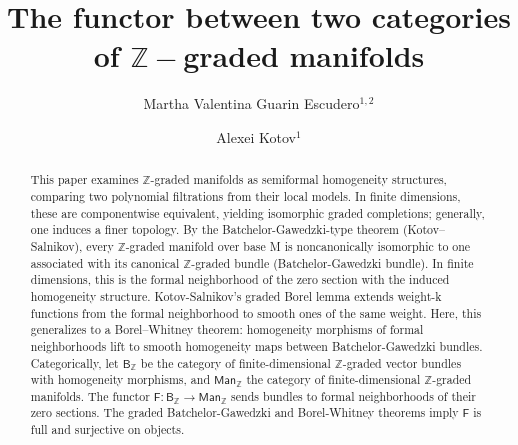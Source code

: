 \documentclass[a4paper,12pt]{amsart}
\newcommand{\Z}{{\mathbb Z}}
\begin{document}
    



\title{The functor between two categories of $\Z-$graded manifolds}


\author{Martha Valentina Guarin Escudero$^{1,2}$}


\author{Alexei Kotov$^1$}
\address{1. Faculty of Science, University of Hradec Kralove, Rokitanskeho 62, Hradec Kralove
50003, Czech Republic}

\address{2. Mathematical Institute of Charles University,
Sokolovská 49/83, Prague-8 186 75, Czech Republic }



\begin{abstract} 
This paper examines \(\mathbb{Z}\)-graded manifolds as semiformal homogeneity structures, comparing two polynomial filtrations from their local models. In finite dimensions, these are componentwise equivalent, yielding isomorphic graded completions; generally, one induces a finer topology. By the Batchelor-Gawedzki-type theorem (Kotov--Salnikov), every \(\mathbb{Z}\)-graded manifold over base M is noncanonically isomorphic to one associated with its canonical \(\mathbb{Z}\)-graded bundle (Batchelor-Gawedzki bundle). In finite dimensions, this is the formal neighborhood of the zero section with the induced homogeneity structure. Kotov-Salnikov's graded Borel lemma extends weight-k functions from the formal neighborhood to smooth ones of the same weight. Here, this generalizes to a Borel--Whitney theorem: homogeneity morphisms of formal neighborhoods lift to smooth homogeneity maps between Batchelor-Gawedzki bundles. Categorically, let \(\mathsf{B}_{\mathbb{Z}}\) be the category of finite-dimensional \(\mathbb{Z}\)-graded vector bundles with homogeneity morphisms, and \(\mathsf{Man}_{\mathbb{Z}}\) the category of finite-dimensional \(\mathbb{Z}\)-graded manifolds. The functor \(\mathsf{F}\colon \mathsf{B}_{\mathbb{Z}} \to \mathsf{Man}_{\mathbb{Z}}\) sends bundles to formal neighborhoods of their zero sections. The graded Batchelor-Gawedzki and Borel-Whitney theorems imply \(\mathsf{F}\) is full and surjective on objects.
\end{abstract}

\maketitle
\end{document}
